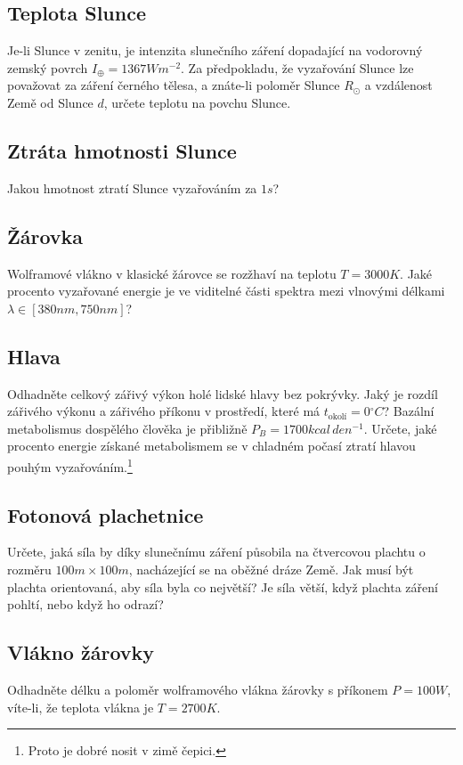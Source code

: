 \subsection{Teplota Slunce}
    Je-li Slunce v zenitu, je intenzita slunečního záření dopadající na vodorovný zemský povrch $I_{\oplus}=1367\unit{Wm^{-2}}$.
    Za předpokladu, že vyzařování Slunce lze považovat za záření černého tělesa, a znáte-li poloměr Slunce $R_{\odot}$ a vzdálenost Země od Slunce $d$, určete teplotu na povchu Slunce.

\subsection{Ztráta hmotnosti Slunce}
    Jakou hmotnost ztratí Slunce vyzařováním za $1\unit{s}$?

\subsection{Žárovka}
    Wolframové vlákno v klasické žárovce se rozžhaví na teplotu $T=3000\unit{K}$.
    Jaké procento vyzařované energie je ve viditelné části spektra mezi vlnovými délkami $\lambda\in[380\unit{nm},750\unit{nm}]$?

\subsection{Hlava}
    Odhadněte celkový zářivý výkon holé lidské hlavy bez pokrývky.
    Jaký je rozdíl zářivého výkonu a zářivého příkonu v prostředí, které má $t_{\text{okolí}}=0\unit{^\circ C}$?
    Bazální metabolismus dospělého člověka je přibližně $P_{B}=1700\unit{kcal\,den^{-1}}$.
    Určete, jaké procento energie získané metabolismem se v chladném počasí ztratí hlavou pouhým vyzařováním.\footnote{
        Proto je dobré nosit v zimě čepici.
    }

\subsection{Fotonová plachetnice}
    Určete, jaká síla by díky slunečnímu záření působila na čtvercovou plachtu o rozměru $100\unit{m}\times 100\unit{m}$, nacházející se na oběžné dráze Země. 
    Jak musí být plachta orientovaná, aby síla byla co největší?
    Je síla větší, když plachta záření pohltí, nebo když ho odrazí?

\subsection{Vlákno žárovky}
    Odhadněte délku a poloměr wolframového vlákna žárovky s příkonem $P=100\unit{W}$, víte-li, že teplota vlákna je $T=2700\unit{K}$.

